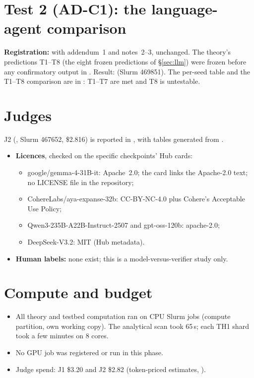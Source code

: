 \section{Test 2 (AD-C1): the language-agent comparison}\label{app3:c1}
\textbf{Registration:}  with addendum~1 and notes~2--3, unchanged. The theory's
predictions T1--T8 (the eight frozen predictions of \S\ref{sec:llm}) were frozen before any confirmatory output in .
Result:  (Slurm 469851). The per-seed table and the T1--T8 comparison are in
: T1--T7 are met and T8 is untestable.

\section{Judges}\label{app3:judge}
J2 (, Slurm 467652, \$2.816) is reported in , with
tables generated from .
\begin{itemize}
\item \textbf{Licences}, checked on the specific checkpoints' Hub cards:
\begin{itemize}
\item google/gemma-4-31B-it: Apache~2.0; the card links the Apache-2.0 text; no LICENSE file in the repository;
\item CohereLabs/aya-expanse-32b: CC-BY-NC-4.0 plus Cohere's Acceptable Use Policy;
\item Qwen3-235B-A22B-Instruct-2507 and gpt-oss-120b: apache-2.0;
\item DeepSeek-V3.2: MIT (Hub metadata).
\end{itemize}
\item \textbf{Human labels:} none exist; this is a model-versus-verifier study only.
\end{itemize}

\section{Compute and budget}\label{app3:compute}
\begin{itemize}
\item All theory and testbed computation ran on CPU Slurm jobs (compute partition, own working copy). The analytical
scan took 65\,s; each TH1 shard took a few minutes on 8 cores.
\item No GPU job was registered or run in this phase.
\item Judge spend: J1 \$3.20 and J2 \$2.82 (token-priced estimates, ).
\end{itemize}

